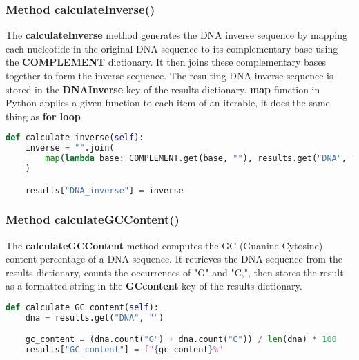 \documentclass[11pt]{article}
\begin{document}
\subsubsection{Method calculateInverse()}
The \textbf{calculateInverse} method generates the DNA inverse sequence by mapping each nucleotide in the original DNA sequence to its complementary base using the \textbf{COMPLEMENT} dictionary. It then joins these complementary bases together to form the inverse sequence. The resulting DNA inverse sequence is stored in the \textbf{DNAInverse} key of the results dictionary. \textbf{map} function in Python applies a given function to each item of an iterable, it does the same thing as \textbf{for loop}
\begin{lstlisting}[language=Python, style=PythonStyle]
def calculate_inverse(self):
    inverse = "".join(
        map(lambda base: COMPLEMENT.get(base, ""), results.get("DNA", ""))
    )

    results["DNA_inverse"] = inverse
\end{lstlisting}
\subsubsection{Method calculateGCContent()}
The \textbf{calculateGCContent} method computes the GC (Guanine-Cytosine) content percentage of a DNA sequence. It retrieves the DNA sequence from the results dictionary, counts the occurrences of "G" and "C,", then stores the result as a formatted string in the \textbf{GCcontent} key of the results dictionary.
\begin{lstlisting}[language=Python, style=PythonStyle]
def calculate_GC_content(self):
    dna = results.get("DNA", "")

    gc_content = (dna.count("G") + dna.count("C")) / len(dna) * 100
    results["GC_content"] = f"{gc_content}%"
\end{lstlisting}
\end{document}
